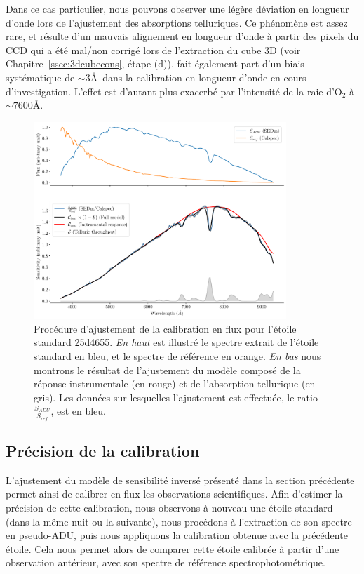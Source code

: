 \documentclass[../main/main.tex]{subfiles}
\begin{document}
Dans ce cas particulier, nous pouvons
observer une légère déviation en longueur d'onde lors de l'ajustement
des absorptions telluriques. Ce phénomène est assez rare, et résulte
d'un mauvais alignement en longueur d'onde
à partir des pixels du CCD qui a été mal/non
corrigé lors de l'extraction du cube 3D (voir
Chapitre~\ref{ssec:3dcubecons}, étape (d)). \citet{pysedm} fait
également part d'un biais systématique de $\sim3$\AA\ dans la
calibration en longueur d'onde en cours d'investigation. L'effet est d'autant plus
exacerbé par l'intensité de la raie d'O$_{2}$ à $\sim7600$\AA.

\begin{figure}[ht]
  \centering
  \includegraphics[width=0.85\textwidth]{../figures/06_irf/calibmodel.pdf}
  \caption[Procédure d'ajustement de la calibration en flux]{Procédure
    d'ajustement de la calibration en flux pour l'étoile standard
    25d4655. \emph{En haut} est illustré le spectre extrait de l'étoile
    standard en bleu, et le spectre de référence en orange. \emph{En
      bas} nous montrons le résultat de l'ajustement du modèle composé
    de la réponse instrumentale (en rouge) et de l'absorption tellurique
  (en gris). Les données sur lesquelles l'ajustement est effectuée, le
  ratio $\frac{S_{ADU}}{S_{ref}}$, est en bleu.}
  \label{fig:calibmodel}
\end{figure}

\subsection{Précision de la calibration}\label{ssec:resultscalib}

L'ajustement du modèle de sensibilité inversé présenté dans la section
précédente permet ainsi de calibrer en flux les observations
scientifiques. Afin d'estimer la précision de cette calibration, nous
observons à nouveau une étoile standard (dans la même nuit ou la
suivante), nous procédons à l'extraction de son spectre en pseudo-ADU,
puis nous appliquons la calibration obtenue avec la précédente étoile.
Cela nous permet alors de comparer cette étoile calibrée à partir d'une
observation antérieur, avec son spectre de référence
spectrophotométrique.
\end{document}
